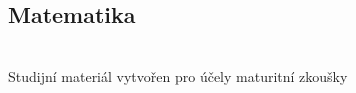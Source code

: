 \documentclass[../main.tex]{subfiles}
\begin{document}
\fontsize{10pt}{10pt}\selectfont\setlength\parindent{0em}
\pagestyle{empty}
\pagecolor{MPC}
\vspace{\fill}

\begin{center}
{\color{white}
\part{Matematika}
}
{\color{white}\LARGE \WSauthor}\\
\vspace*{1em}
{\color{white}\Large Studijní materiál vytvořen pro účely maturitní zkoušky}
\end{center}


\newpage
\pagecolor{white}

\blankpage

\newpage
\end{document}
